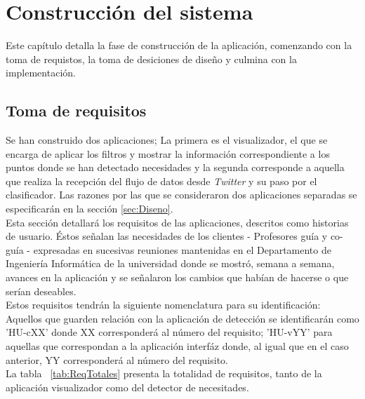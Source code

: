\chapter{Construcción del sistema}
\label{cap:Construccion}

Este capítulo detalla la fase de construcción de la aplicación, comenzando con la toma de requistos, la toma de desiciones de diseño y culmina con la implementación.

\section{Toma de requisitos}
\label{sec:Requisitos}

Se han construido dos aplicaciones; La primera es el visualizador, el que se encarga de aplicar los filtros y mostrar la información correspondiente a los puntos donde se han detectado necesidades y la segunda corresponde a aquella que realiza la recepción del flujo de datos desde \textit{Twitter} y su paso por el clasificador. Las razones por las que se consideraron dos aplicaciones separadas se especificarán en la sección \ref{sec:Diseno}.\\

Esta sección detallará los requisitos de las aplicaciones, descritos como historias de usuario. Éstos señalan las necesidades de los clientes - Profesores guía y co-guía - expresadas en sucesivas reuniones mantenidas en el Departamento de Ingeniería Informática de la universidad donde se mostró, semana a semana, avances en la aplicación y se señalaron los cambios que habían de hacerse o que serían deseables.\\

Estos requisitos tendrán la siguiente nomenclatura para su identificación: Aquellos que guarden relación con la aplicación de detección se identificarán como 'HU-cXX' donde XX corresponderá al número del requisito; 'HU-vYY' para aquellas que correspondan a la aplicación interfáz donde, al igual que en el caso anterior, YY corresponderá al número del requisito.\\

La tabla ~\ref{tab:ReqTotales} presenta la totalidad de requisitos, tanto de la aplicación visualizador como del detector de necesitades.\\


